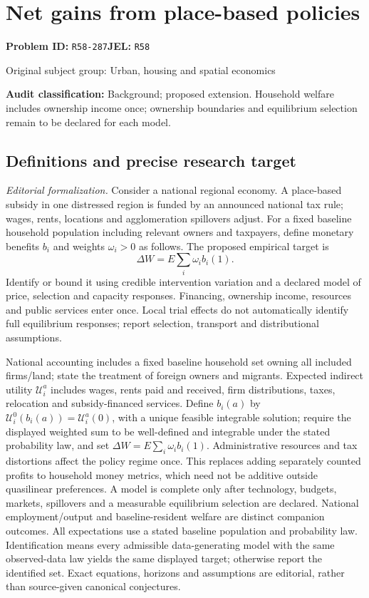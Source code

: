 \documentclass[11pt,a4paper]{article}
\begin{document}
\section*{Net gains from place-based policies}
\textbf{Problem ID:} \texttt{R58-287}\quad \textbf{JEL:} \texttt{R58}\par
\label{problem:OP-0467}
{\sffamily\small\color{muted}Original subject group: Urban, housing and spatial economics\par}
\label{definitions:problem:30007749}
\textbf{Audit classification:} Background; proposed extension. Household welfare includes ownership income once; ownership boundaries and equilibrium selection remain to be declared for each model.
\subsection*{Definitions and precise research target}
\textit{Editorial formalization.} Consider a national regional economy. A place-based subsidy in one distressed region is funded by an announced national tax rule; wages, rents, locations and agglomeration spillovers adjust. For a fixed baseline household population including relevant owners and taxpayers, define monetary benefits \(b_i\) and weights \(\omega_i>0\) as follows. The proposed empirical target is \[\Delta W=E\sum_i\omega_i b_i(1).\] Identify or bound it using credible intervention variation and a declared model of price, selection and capacity responses. Financing, ownership income, resources and public services enter once. Local trial effects do not automatically identify full equilibrium responses; report selection, transport and distributional assumptions.

National accounting includes a fixed baseline household set owning all included firms/land; state the treatment of foreign owners and migrants. Expected indirect utility \(\mathcal U_i^a\) includes wages, rents paid and received, firm distributions, taxes, relocation and subsidy-financed services. Define \(b_i(a)\) by \(\mathcal U_i^0(b_i(a))=\mathcal U_i^a(0)\), with a unique feasible integrable solution; require the displayed weighted sum to be well-defined and integrable under the stated probability law, and set \(\Delta W=E\sum_i\omega_i b_i(1)\). Administrative resources and tax distortions affect the policy regime once. This replaces adding separately counted profits to household money metrics, which need not be additive outside quasilinear preferences. A model is complete only after technology, budgets, markets, spillovers and a measurable equilibrium selection are declared. National employment/output and baseline-resident welfare are distinct companion outcomes. All expectations use a stated baseline population and probability law. Identification means every admissible data-generating model with the same observed-data law yields the same displayed target; otherwise report the identified set. Exact equations, horizons and assumptions are editorial, rather than source-given canonical conjectures.
\end{document}
